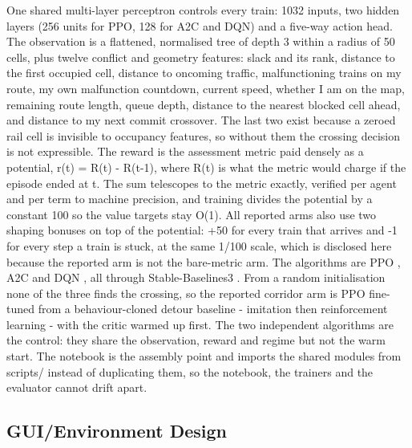 \documentclass[11pt,a4paper]{article}
\begin{document}
One shared multi-layer perceptron controls every train: 1032 inputs, two hidden layers (256 units for PPO, 128 for A2C and DQN) and a five-way action head. The observation is a flattened, normalised tree of depth 3 within a radius of 50 cells, plus twelve conflict and geometry features: slack and its rank, distance to the first occupied cell, distance to oncoming traffic, malfunctioning trains on my route, my own malfunction countdown, current speed, whether I am on the map, remaining route length, queue depth, distance to the nearest blocked cell ahead, and distance to my next commit crossover. The last two exist because a zeroed rail cell is invisible to occupancy features, so without them the crossing decision is not expressible.
The reward is the assessment metric paid densely as a potential, r(t) = R(t) - R(t-1), where R(t) is what the metric would charge if the episode ended at t. The sum telescopes to the metric exactly, verified per agent and per term to machine precision, and training divides the potential by a constant 100 so the value targets stay O(1). All reported arms also use two shaping bonuses on top of the potential: +50 for every train that arrives and -1 for every step a train is stuck, at the same 1/100 scale, which is disclosed here because the reported arm is not the bare-metric arm.
The algorithms are PPO \parencite{schulman2017}, A2C \parencite{mnih2016} and DQN \parencite{mnih2015}, all through Stable-Baselines3 \parencite{raffin2021}. From a random initialisation none of the three finds the crossing, so the reported corridor arm is PPO fine-tuned from a behaviour-cloned detour baseline - imitation then reinforcement learning \parencite{ross2011} - with the critic warmed up first. The two independent algorithms are the control: they share the observation, reward and regime but not the warm start. The notebook is the assembly point and imports the shared modules from scripts/ instead of duplicating them, so the notebook, the trainers and the evaluator cannot drift apart.
\subsection{GUI/Environment Design}
\end{document}
